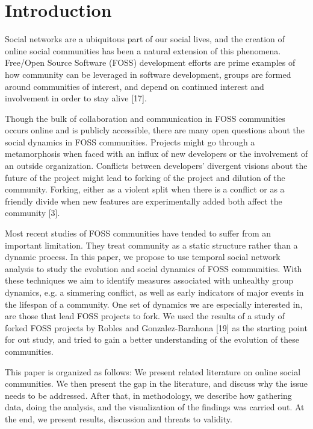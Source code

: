 \documentclass[ifip]{svmult}
\begin{document}
\section{Introduction}
\label{sec:1}
Social networks are a ubiquitous part of our social lives, and the creation of online social communities has been a natural extension of this phenomena. Free/Open Source Software (FOSS) development efforts are prime examples of how community can be leveraged in software development, groups are formed around communities of interest, and depend on continued interest and involvement in order to stay alive [17].

Though the bulk of collaboration and communication in FOSS communities occurs online and is publicly accessible, there are many open questions about the social dynamics in FOSS communities. Projects might go through a metamorphosis when faced with an influx of new developers or the involvement of an outside organization. Conflicts between developers' divergent visions about the future of the project might lead to forking of the project and dilution of the community. Forking, either as a violent split when there is a conflict or as a friendly divide when new features are experimentally added both affect the community [3].

Most recent studies of FOSS communities have tended to suffer from an important limitation. They treat community as a static structure rather than a dynamic process. In this paper, we propose to use temporal social network analysis to study the evolution and social dynamics of FOSS communities. With these techniques we aim to identify measures associated with unhealthy group dynamics, e.g. a simmering conflict, as well as early indicators of major events in the lifespan of a community. One set of dynamics we are especially interested in, are those that lead FOSS projects to fork. We used the results of a study of forked FOSS projects by Robles and Gonzalez-Barahona [19] as the starting point for out study, and tried to gain a better understanding of the evolution of these communities.

This paper is organized as follows: We present related literature on online social communities. We then present the gap in the literature, and discuss why the issue needs to be addressed. After that, in methodology, we describe how gathering data, doing the analysis, and the visualization of the findings was carried out. At the end, we present results, discussion and threats to validity.
\end{document}
